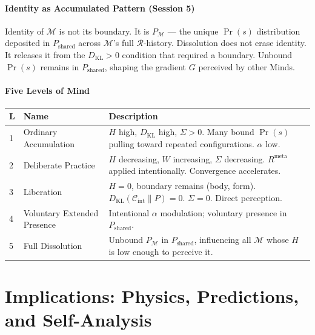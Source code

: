 \documentclass[12pt, a4paper]{article}
\begin{document}
\subsection{Identity as Accumulated Pattern (Session 5)}

Identity of $\mathcal{M}$ is not its boundary. It is $P_\mathcal{M}$ --- the unique
$\Pr(s)$ distribution deposited in $P_{\mathrm{shared}}$ across $\mathcal{M}$'s full
$\mathcal{R}$-history. Dissolution does not erase identity. It releases it from the
$D_{\mathrm{KL}} > 0$ condition that required a boundary. Unbound $\Pr(s)$ remains in
$P_{\mathrm{shared}}$, shaping the gradient $G$ perceived by other Minds.

\subsection{Five Levels of Mind}

\begin{center}
\renewcommand{\arraystretch}{1.3}
\begin{tabular}{p{0.4cm} p{3.5cm} p{8cm}}
\toprule
\textbf{L} & \textbf{Name} & \textbf{Description} \\
\midrule
1 & Ordinary Accumulation & $H$ high, $D_{\mathrm{KL}}$ high, $\Sigma > 0$. Many bound $\Pr(s)$ pulling toward repeated configurations. $\alpha$ low. \\
2 & Deliberate Practice & $H$ decreasing, $W$ increasing, $\Sigma$ decreasing. $R^{\mathrm{meta}}$ applied intentionally. Convergence accelerates. \\
3 & Liberation & $H = 0$, boundary remains (body, form). $D_{\mathrm{KL}}(\mathcal{C}_{\mathrm{int}}\|P) = 0$. $\Sigma = 0$. Direct perception. \\
4 & Voluntary Extended Presence & Intentional $\alpha$ modulation; voluntary presence in $P_{\mathrm{shared}}$. \\
5 & Full Dissolution & Unbound $P_\mathcal{M}$ in $P_{\mathrm{shared}}$, influencing all $\mathcal{M}$ whose $H$ is low enough to perceive it. \\
\bottomrule
\end{tabular}
\end{center}

\part{Implications: Physics, Predictions, and Self-Analysis}
\end{document}
